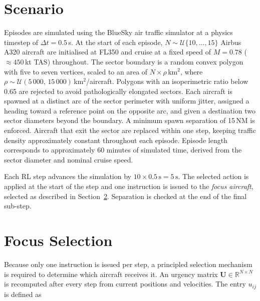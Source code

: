 \documentclass[11pt, a4paper]{article}
\begin{document}
\section{Scenario}
\label{sec:scenario}

Episodes are simulated using the BlueSky air traffic simulator at a physics
timestep of $\Delta t = 0.5$\,s.
At the start of each episode, $N \sim \mathcal{U}\{10,\ldots,15\}$ Airbus A320
aircraft are initialised at FL350 and cruise at a fixed speed of
$M = 0.78$ ($\approx 450$\,kt TAS) throughout.
The sector boundary is a random convex polygon with five to seven vertices,
scaled to an area of $N \times \rho$\,km$^2$, where
$\rho \sim \mathcal{U}(5\,000,\,15\,000)$\,km$^2$/aircraft.
Polygons with an isoperimetric ratio below 0.65 are rejected to avoid
pathologically elongated sectors.
Each aircraft is spawned at a distinct arc of the sector perimeter with
uniform jitter, assigned a heading toward a reference point on the opposite
arc, and given a destination two sector diameters beyond the boundary.
A minimum spawn separation of 15\,NM is enforced.
Aircraft that exit the sector are replaced within one step, keeping traffic
density approximately constant throughout each episode.
Episode length corresponds to approximately 60 minutes of simulated time,
derived from the sector diameter and nominal cruise speed.

Each RL step advances the simulation by $10 \times 0.5\,\text{s} = 5\,\text{s}$.
The selected action is applied at the start of the step and one instruction
is issued to the \textit{focus aircraft}, selected as described in
Section~\ref{sec:focus}.
Separation is checked at the end of the final sub-step.

\section{Focus Selection}
\label{sec:focus}

Because only one instruction is issued per step, a principled selection
mechanism is required to determine which aircraft receives it.
An urgency matrix $\mathbf{U} \in \mathbb{R}^{N \times N}$ is recomputed
after every step from current positions and velocities.
The entry $u_{ij}$ is defined as
\end{document}
